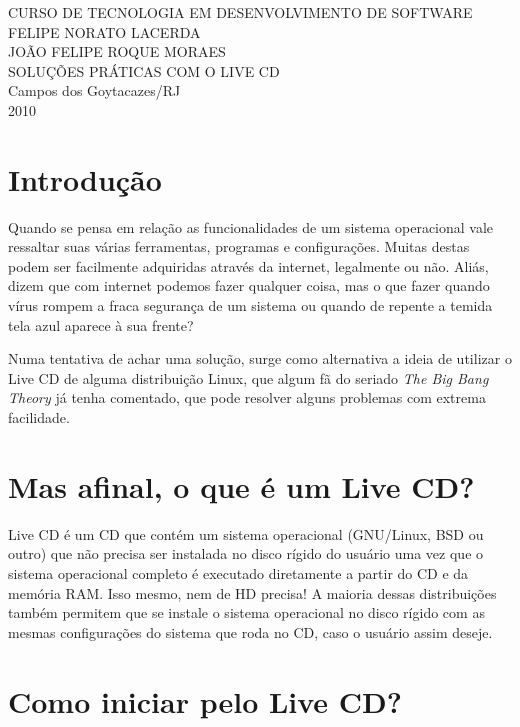 \documentclass[12pt, a4paper, tocpage=plain]{abnt} %
\begin{document}

\begin{titlepage}
 \begin{center}
   {\large CURSO DE TECNOLOGIA EM DESENVOLVIMENTO DE SOFTWARE} \\ [3.5cm]
   {\large FELIPE NORATO LACERDA} \\
   {\large JOÃO FELIPE ROQUE MORAES} \\ [4cm]
   {\large SOLUÇÕES PRÁTICAS COM O LIVE CD} \\
   \vfill
   {\large Campos dos Goytacazes/RJ} \\
   {\large 2010}
 \end{center}
\end{titlepage}

\tableofcontents

\chapter{Introdução}


Quando se pensa em relação as funcionalidades de um sistema operacional vale ressaltar suas várias ferramentas, programas e configurações. Muitas destas podem ser facilmente adquiridas através da internet, legalmente ou não. Aliás, dizem que com internet podemos fazer qualquer coisa, mas o que fazer quando vírus rompem a fraca segurança de um sistema ou quando de repente a temida tela azul aparece à sua frente? 

Numa tentativa de achar uma solução, surge como alternativa a ideia de utilizar  o Live CD de alguma distribuição Linux, que algum fã do seriado {\it The Big Bang Theory} já tenha comentado, que pode resolver alguns problemas com extrema facilidade.


\chapter{Mas afinal, o que é um Live CD?}

Live CD é um CD que contém um sistema operacional (GNU/Linux, BSD ou outro) que não precisa ser instalada no disco rígido do usuário uma vez que o sistema operacional completo é executado diretamente a partir do CD e da memória RAM. Isso mesmo, nem de HD precisa! A maioria dessas distribuições também permitem que se instale o sistema operacional no disco rígido com as mesmas configurações do sistema que roda no CD, caso o usuário assim deseje.

\chapter{Como iniciar pelo Live CD?}
\end{document}
